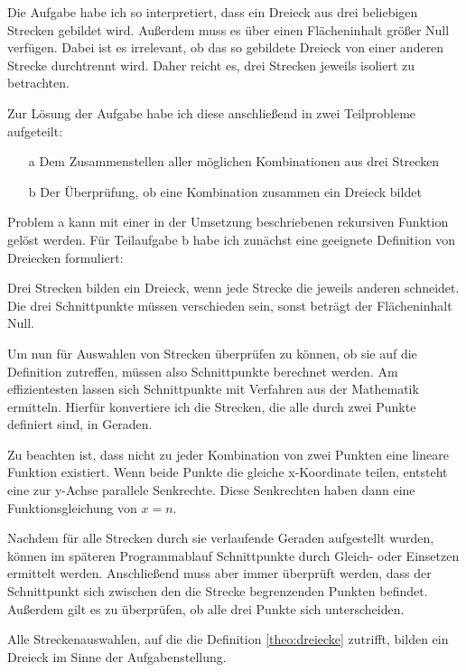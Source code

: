 Die Aufgabe habe ich so interpretiert, dass ein Dreieck aus drei beliebigen Strecken
gebildet wird.
Außerdem muss es über einen Flächeninhalt größer Null verfügen.
Dabei ist es irrelevant, ob das so gebildete Dreieck von einer
anderen Strecke durchtrennt wird.
Daher reicht es, drei Strecken jeweils isoliert zu betrachten.

Zur Lösung der Aufgabe habe ich diese anschließend in zwei Teilprobleme aufgeteilt:
\begin{itemize}
    \item[a] Dem Zusammenstellen aller möglichen Kombinationen aus drei Strecken
    \item[b] Der Überprüfung, ob eine Kombination zusammen ein Dreieck bildet
\end{itemize}

Problem a kann mit einer in der Umsetzung beschriebenen rekursiven Funktion gelöst werden.
Für Teilaufgabe b habe ich zunächst eine geeignete Definition von Dreiecken formuliert:
\begin{definition} \label{theo:dreiecke}
Drei Strecken bilden ein Dreieck,
wenn jede Strecke die jeweils anderen schneidet.
Die drei Schnittpunkte müssen verschieden sein,
sonst beträgt der Flächeninhalt Null.
\end{definition}

Um nun für Auswahlen von Strecken überprüfen zu können, ob sie auf die Definition 
zutreffen, müssen also Schnittpunkte berechnet werden.
Am effizientesten lassen sich Schnittpunkte mit Verfahren aus der Mathematik ermitteln.
Hierfür konvertiere ich die Strecken, die alle durch zwei Punkte definiert sind, in Geraden.

Zu beachten ist, dass nicht zu jeder Kombination von zwei Punkten eine lineare
Funktion existiert. Wenn beide Punkte die gleiche x-Koordinate teilen, entsteht eine zur
y-Achse parallele Senkrechte. Diese Senkrechten haben dann eine Funktionsgleichung von
\(x=n\).

Nachdem für alle Strecken durch sie verlaufende Geraden aufgestellt wurden, können
im späteren Programmablauf Schnittpunkte durch Gleich- oder Einsetzen ermittelt
werden. Anschließend muss aber immer überprüft werden, dass der Schnittpunkt sich
zwischen den die Strecke begrenzenden Punkten befindet. Außerdem gilt es zu überprüfen,
ob alle drei Punkte sich unterscheiden.

Alle Streckenauswahlen, auf die die Definition \ref{theo:dreiecke} zutrifft, bilden
ein Dreieck im Sinne der Aufgabenstellung.
